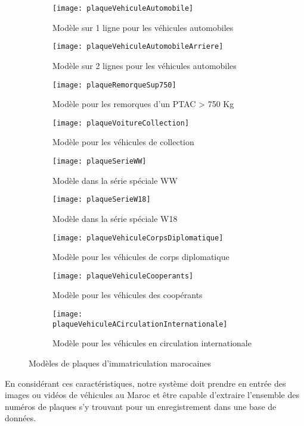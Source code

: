        \begin{figure}[H]
            \begin{subfigure}{0.3\textwidth}
                \texttt{[image: plaqueVehiculeAutomobile]}
                \caption{Modèle sur 1 ligne pour les véhicules automobiles}
            \end{subfigure}
            \hfill
            \begin{subfigure}{0.3\textwidth}
                \texttt{[image: plaqueVehiculeAutomobileArriere]}
                \caption{Modèle sur 2 lignes pour les véhicules automobiles}
            \end{subfigure}
            \hfill
            \begin{subfigure}{0.3\textwidth}
                \texttt{[image: plaqueRemorqueSup750]}
                \caption{Modèle pour les remorques d'un PTAC > 750 Kg}
            \end{subfigure}

            \begin{subfigure}{0.3\textwidth}
                \texttt{[image: plaqueVoitureCollection]}
                \caption{Modèle pour les véhicules de collection}
            \end{subfigure}
            \hfill
            \begin{subfigure}{0.3\textwidth}
                \texttt{[image: plaqueSerieWW]}
                \caption{Modèle dans la série spéciale WW}
            \end{subfigure}
            \hfill
            \begin{subfigure}{0.3\textwidth}
                \texttt{[image: plaqueSerieW18]}
                \caption{Modèle dans la série spéciale W18}
            \end{subfigure}

            \begin{subfigure}{0.3\textwidth}
                \texttt{[image: plaqueVehiculeCorpsDiplomatique]}
                \caption{Modèle pour les véhicules de corps diplomatique}
            \end{subfigure}
            \hfill
            \begin{subfigure}{0.3\textwidth}
                \texttt{[image: plaqueVehiculeCooperants]}
                \caption{Modèle pour les véhicules des coopérants}
            \end{subfigure}
            \hfill
            \begin{subfigure}{0.3\textwidth}
                \texttt{[image: plaqueVehiculeACirculationInternationale]}
                \caption{Modèle pour les véhicules en circulation internationale}
            \end{subfigure}
            \caption{Modèles de plaques d'immatriculation marocaines}
        \end{figure}
    En considérant ces caractéristiques, notre système doit prendre en entrée des images ou vidéos de véhicules au Maroc et être capable d'extraire l'ensemble des  numéros de plaques s'y trouvant pour un enregistrement dans une base de données.

